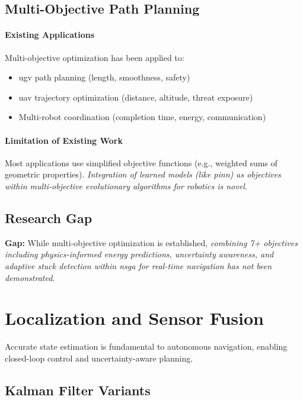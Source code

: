 \subsection{Multi-Objective Path Planning}

\paragraph{Existing Applications}
Multi-objective optimization has been applied to:
\begin{itemize}
    \item \acrshort{ugv} path planning \cite{Ahmed2013} (length, smoothness, safety)
    \item \acrshort{uav} trajectory optimization \cite{Roberge2018} (distance, altitude, threat exposure)
    \item Multi-robot coordination \cite{Hao2019} (completion time, energy, communication)
\end{itemize}

\paragraph{Limitation of Existing Work}
Most applications use simplified objective functions (e.g., weighted sums of geometric properties). \textit{Integration of learned models (like \acrshort{pinn}) as objectives within multi-objective evolutionary algorithms for robotics is novel.}

\subsection{Research Gap}
\textbf{Gap:} While multi-objective optimization is established, \textit{combining 7+ objectives including physics-informed energy predictions, uncertainty awareness, and adaptive stuck detection within \acrshort{nsga} for real-time navigation has not been demonstrated.}

\section{Localization and Sensor Fusion}
\label{sec:lit_localization}

Accurate state estimation is fundamental to autonomous navigation, enabling closed-loop control and uncertainty-aware planning.

\subsection{Kalman Filter Variants}

